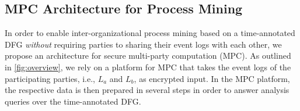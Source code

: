%

\subsection{MPC Architecture for Process Mining}
\label{sec:core_approach}

In order to enable inter-organizational process mining based on a 
time-annotated DFG \emph{without} requiring parties to sharing their event logs 
with each other, we propose an architecture for secure multi-party computation 
(MPC). As outlined in \autoref{fig:overview}, we rely on a platform for MPC 
that takes the event logs of the participating parties, i.e., $L_a$ and $L_b$, 
as encrypted input. In the MPC platform, the respective data is then prepared 
in several steps in order to answer analysis queries over the time-annotated 
DFG. 

